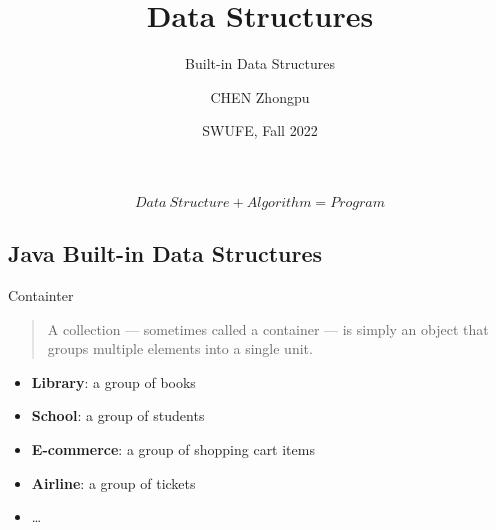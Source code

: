 \documentclass[aspectratio=169, 14pt]{beamer}
\title[Data Structures] %
{Data Structures}
\subtitle{Built-in Data Structures}
\author[CHEN Zhongpu] %
{CHEN Zhongpu}
\institute[] %
{
  School of Computing and Artificial Intelligence \\
  \href{mailto:zpchen@swufe.edu.cn}{zpchen@swufe.edu.cn}
}
\date[] %
{SWUFE, Fall 2022}
\begin{document}
\frame{\titlepage}

\begin{frame}
    \Large $$Data\ Structure + Algorithm = Program$$
\end{frame}

{
    \begin{frame}
        \section{\textcolor{darkmidnightblue}{Java Built-in Data Structures}}
    \end{frame}

}

\begin{frame}{Containter}
    \begin{quote}
        A \alert{collection} — sometimes called a \alert{container} — is simply an object that groups multiple elements into a single unit.
    \end{quote}

    \begin{itemize}
        \item \textbf{Library}: a group of books
        \item \textbf{School}: a group of students
        \item \textbf{E-commerce}: a group of shopping cart items
        \item \textbf{Airline}: a group of tickets 
        \item \dots
    \end{itemize}
\end{frame}
\end{document}
